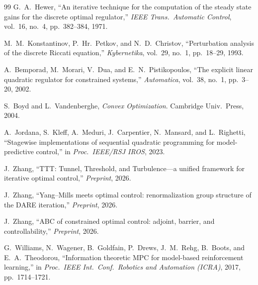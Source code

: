 \begin{thebibliography}{99}
G.~A.~Hewer,
``An iterative technique for the computation of the steady state
gains for the discrete optimal regulator,''
\emph{IEEE Trans.\ Automatic Control}, vol.~16, no.~4,
pp.~382--384, 1971.

M.~M.~Konstantinov, P.~Hr.~Petkov, and N.~D.~Christov,
``Perturbation analysis of the discrete Riccati equation,''
\emph{Kybernetika}, vol.~29, no.~1, pp.~18--29, 1993.

A.~Bemporad, M.~Morari, V.~Dua, and E.~N.~Pistikopoulos,
``The explicit linear quadratic regulator for constrained systems,''
\emph{Automatica}, vol.~38, no.~1, pp.~3--20, 2002.

S.~Boyd and L.~Vandenberghe,
\emph{Convex Optimization}.
Cambridge Univ.\ Press, 2004.

A.~Jordana, S.~Kleff, A.~Meduri, J.~Carpentier, N.~Mansard,
and L.~Righetti,
``Stagewise implementations of sequential quadratic programming
for model-predictive control,''
in \emph{Proc.\ IEEE/RSJ IROS}, 2023.

J.~Zhang,
``TTT: Tunnel, Threshold, and Turbulence---a unified framework
for iterative optimal control,''
\emph{Preprint}, 2026.

J.~Zhang,
``Yang--Mills meets optimal control: renormalization group structure
of the DARE iteration,''
\emph{Preprint}, 2026.

J.~Zhang,
``ABC of constrained optimal control: adjoint, barrier, and
controllability,''
\emph{Preprint}, 2026.

G.~Williams, N.~Wagener, B.~Goldfain, P.~Drews, J.~M.~Rehg,
B.~Boots, and E.~A.~Theodorou,
``Information theoretic MPC for model-based reinforcement learning,''
in \emph{Proc.\ IEEE Int.\ Conf.\ Robotics and Automation (ICRA)},
2017, pp.~1714--1721.

\end{thebibliography}
